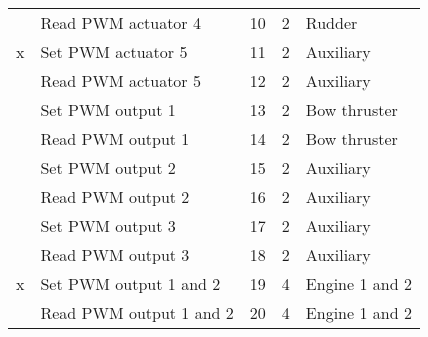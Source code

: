 \begin{table}[h]
\begin{tabular}{llrrl}
	& Read PWM actuator 4 & 10 & 2 & Rudder\\ 
	x& Set PWM actuator 5 & 11 & 2 & Auxiliary\\
	& Read PWM actuator 5 & 12 & 2 & Auxiliary\\ 
	& Set PWM output 1 & 13 & 2 & Bow thruster\\
	& Read PWM output 1 & 14 & 2 & Bow thruster\\ 
	& Set PWM output 2 & 15 & 2 & Auxiliary\\
	& Read PWM output 2 & 16 & 2 & Auxiliary\\ 
	& Set PWM output 3 & 17 & 2 & Auxiliary\\
	& Read PWM output 3 & 18 & 2 & Auxiliary\\ 
	x& Set PWM output 1 and 2 & 19 & 4 & Engine 1 and 2\\
	& Read PWM output 1 and 2 & 20 & 4 & Engine 1 and 2\\ 
	\midrule
	\end{tabular}
\end{table}
\newpage

